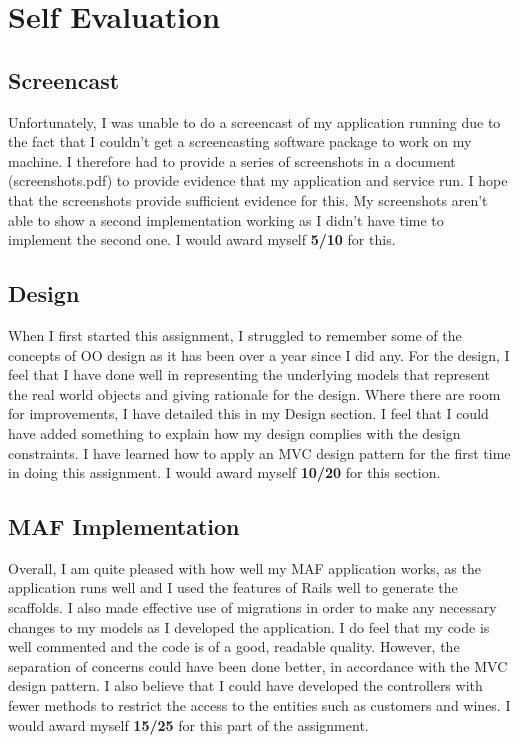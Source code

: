 \documentclass[a4paper,12pt,hidelinks]{report}
\begin{document}
\chapter{Self Evaluation}
    \section{Screencast}
    Unfortunately, I was unable to do a screencast of my application running due to the fact that I couldn't get a screencasting
    software package to work on my machine. I therefore had to provide a series of screenshots in a document (screenshots.pdf) to provide evidence
    that my application and service run. I hope that the screenshots provide sufficient evidence for this. My screenshots aren't able
    to show a second implementation working as I didn't have time to implement the second one. I would award myself \textbf{5/10} for this.

    \section{Design}
    When I first started this assignment, I struggled to remember some of the concepts of OO design as it has been over a year since
    I did any. For the design, I feel that I have done well in representing the underlying models that represent the real world objects and
    giving rationale for the design. Where there are room for improvements, I have detailed this in my Design section. I feel that I could 
    have added something to explain how my design complies with the design
    constraints. I have learned how to apply an MVC design pattern for the first time in doing this assignment. I would award myself
    \textbf{10/20} for this section.

    \section{MAF Implementation}
    Overall, I am quite pleased with how well my MAF application works, as the application runs well and I used the features of Rails
    well to generate the scaffolds. I also made effective use of migrations in order to make any necessary changes to my models
    as I developed the application. I do feel that my code is well commented and the code is of a good, readable quality. However, the separation
    of concerns could have been done better, in accordance with the MVC design pattern. I also believe that I could have developed the controllers
    with fewer methods to restrict the access to the entities such as customers and wines. I would award myself \textbf{15/25} for this part of the assignment.
\end{document}

